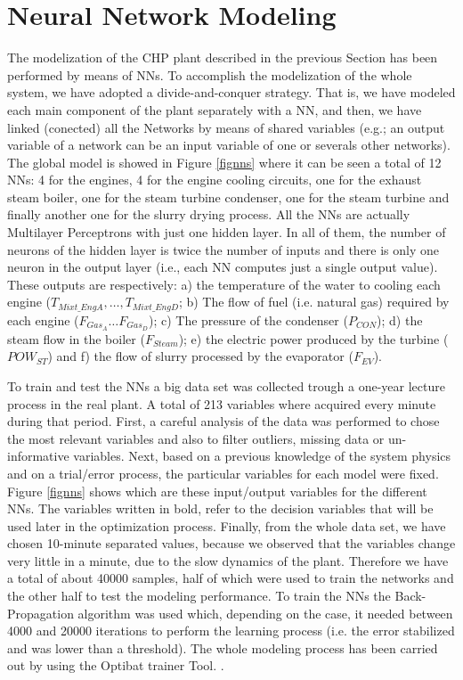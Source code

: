 \section{Neural Network Modeling}
\label{NN}

The modelization of the CHP plant described in the previous Section has been performed by means of  NNs. To accomplish the modelization of the whole system, we have adopted a divide-and-conquer strategy. That is, we have modeled each main component of the plant separately with a NN, and then, we have linked (conected) all the Networks by means of shared variables (e.g.; an output variable of a network can be an input variable of one or severals other networks). The global model is showed in Figure \ref{fignns} where it can be seen a total of 12 NNs: 4 for the engines, 4 for the engine cooling  circuits, one for the exhaust steam boiler, one for the steam turbine condenser, one for the steam turbine and finally another one for the slurry drying process. All the NNs are actually Multilayer Perceptrons with just one hidden layer. In all of them, the number of neurons of the hidden layer is twice the number of inputs and there is only one neuron in the output layer (i.e., each NN computes just a single output value). These outputs are respectively: a) the temperature of the water to cooling each engine ($T_{Mixt\_EngA}, \dots, T_{Mixt\_EngD}$; b) The flow of fuel (i.e. natural gas) required by each engine ($F_{Gas_A} \dots F_{Gas_D}$); c) The pressure of the condenser ($P_{CON}$); d) the steam flow in the boiler ($F_{Steam}$); e) the electric power produced by the turbine ($POW_{ST}$) and f) the flow of slurry processed by the evaporator ($F_{EV}$). 

To train and test the NNs a big data set was collected trough a one-year lecture process in the real plant. A total of  213 variables where acquired every minute during that period. First, a careful analysis of the data was performed to chose the most relevant variables and also to filter outliers, missing data or un-informative variables. Next, based on a previous knowledge of the system physics and on a trial/error process, the particular variables for each model were fixed. Figure \ref{fignns} shows which are these input/output variables for the different NNs. The variables written in bold, refer to the decision variables that will be used later in the optimization process. Finally, from the whole data set, we have chosen 10-minute separated values, because we observed that the variables change very little in a minute, due to the slow dynamics of the plant. Therefore we have a total of about \num{40000} samples, half of which were used to train the networks and the other half to test the modeling performance. To train the NNs the Back-Propagation algorithm was used which, depending on the case, it needed between \num{4000} and \num{20000} iterations to perform the learning process (i.e. the error stabilized and was lower than a threshold). The whole modeling process has been carried out by using the Optibat trainer Tool. \cite{Optibat}.

